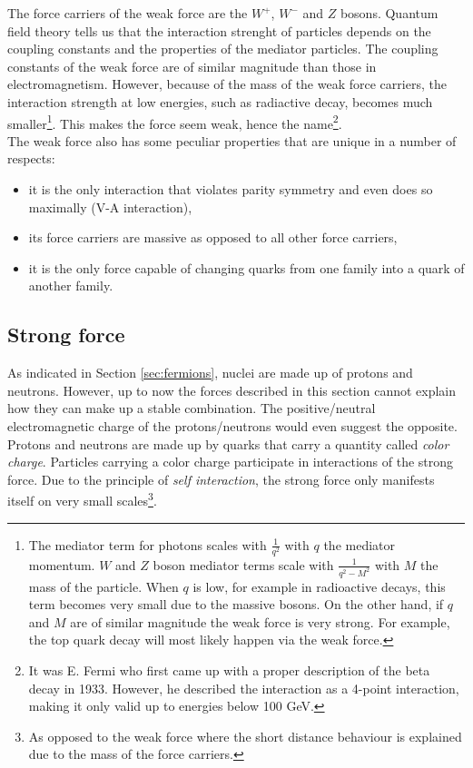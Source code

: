 The force carriers of the weak force are the $W^+$, $W^-$ and $Z$ bosons. 
Quantum field theory tells us that the interaction strenght of particles depends on the coupling constants and the properties of the mediator particles. The coupling constants of the weak force are of similar magnitude than those in electromagnetism. However, because of the mass of the weak force carriers, the interaction strength at low energies, such as radiactive decay, becomes much smaller\footnote{The mediator term for photons scales with $\frac{1}{q^2}$ with  $q$ the mediator momentum. $W$ and $Z$ boson mediator terms scale with $\frac{1}{q^2 - M^2}$ with $M$ the mass of the particle. When $q$ is low, for example in radioactive decays, this term becomes very small due to the massive bosons. On the other hand, if $q$ and $M$ are of similar magnitude the weak force is very strong. For example, the top quark decay will most likely happen via the weak force.}. This makes the force seem weak, hence the name\footnote{It was E. Fermi who first came up with a proper description of the beta decay in 1933. However, he described the interaction as a 4-point interaction, making it only valid up to energies below 100 GeV.}.\\
The weak force also has some peculiar properties that are unique in a number of respects:
\begin{itemize}
\item it is the only interaction that violates parity symmetry and even does so maximally (V-A interaction),
\item its force carriers are massive as opposed to all other force carriers,
\item it is the only force capable of changing quarks from one family into a quark of another family.
\end{itemize}

\subsection{Strong force}
\label{subsec:strong}
As indicated in Section \ref{sec:fermions}, nuclei are made up of protons and neutrons. However, up to now the forces described in this section cannot explain how they can make up a stable combination. The positive/neutral electromagnetic charge of the protons/neutrons would even suggest the opposite. Protons and neutrons are made up by quarks that carry a quantity called \textit{color charge}. Particles carrying a color charge participate in interactions of the strong force. Due to the principle of \textit{self interaction}, the strong force only manifests itself on very small scales\footnote{As opposed to the weak force where the short distance behaviour is explained due to the mass of the force carriers.}.

